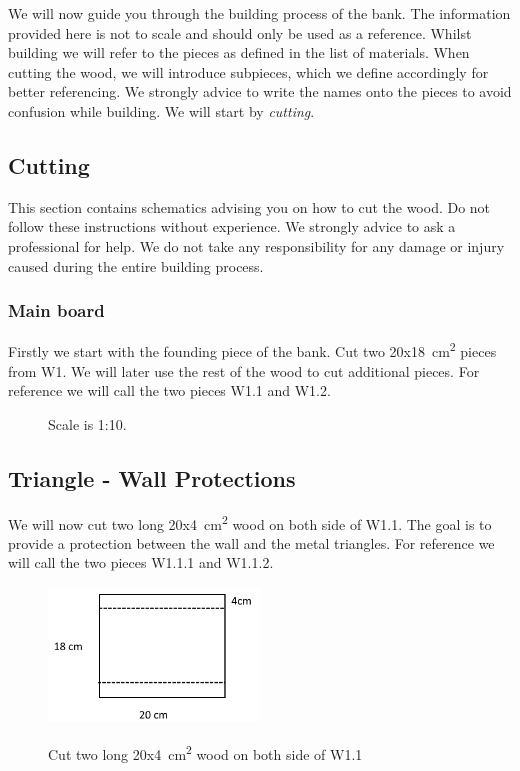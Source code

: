 \documentclass{subfiles}
\begin{document}
    We will now guide you through the building process of the bank. The information provided here is not to scale and should only be used as a reference. Whilst building we will refer to the pieces as defined in the list of materials. When cutting the wood, we will introduce subpieces, which we define accordingly for better referencing. We strongly advice to write the names onto the pieces to avoid confusion while building. We will start by \emph{cutting}.

    \subsection{Cutting}
        This section contains schematics advising you on how to cut the wood. Do not follow these instructions without experience. We strongly advice to ask a professional for help. We do not take any responsibility for any damage or injury caused during the entire building process.

    \subsubsection*{Main board}
    Firstly we start with the founding piece of the bank. Cut two 20x18\SI{}{\square\centi\meter} pieces from W1.
    We will later use the rest of the wood to cut additional pieces. For reference we will call the two pieces W1.1 and W1.2.
    \begin{figure}[H]
        \centering
        
        \caption{Scale is 1:10.}
    \end{figure}


    \subsection*{Triangle - Wall Protections}
    We will now cut two long 20x4\SI{}{\square\centi\meter} wood on both side of W1.1. The goal is to 
    provide a protection between the wall and the metal triangles. For reference we will call the two pieces W1.1.1 and W1.1.2.
    \begin{figure}[h]
        \centering
        \includegraphics[width=0.5\textwidth]{Ressources/Cut_W1_1.png}
        \label{fig:Cut_W1_1}
        \caption{Cut two long 20x4\SI{}{\square\centi\meter} wood on both side of W1.1}
    \end{figure}
\end{document}

